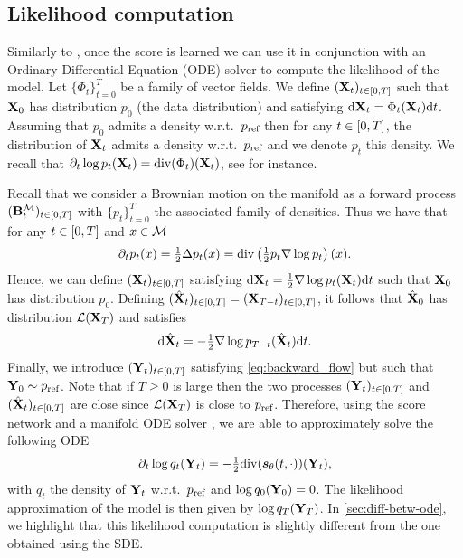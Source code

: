 \subsection{Likelihood computation}
\label{sec:likel-comp}

Similarly to \cite{song2020score}, once the score is learned we can use it
in conjunction with an Ordinary Differential Equation (ODE) solver to compute
the likelihood of the model. Let $\{\Phi_t\}_{t=0}^T$ be a family of vector
fields. We define $(\mathbf{X}_t)_{t \in \left[0,T\right]}$ such that $\mathbf{X}_0$ has
distribution $p_0$ (the data distribution) and satisfying
$\mathrm{d} \mathbf{X}_t = \Phi_t(\mathbf{X}_t) \mathrm{d} t$. Assuming that  $p_0$ admits a density
w.r.t.\ $p_{\textup{ref}}$ then for any $t \in \left[0,T\right]$, the distribution of $\mathbf{X}_t$
admits a density w.r.t.\ $p_{\textup{ref}}$ and we denote $p_t$ this density.  We recall that
$\partial_t \log p_t(\mathbf{X}_t) = \mathrm{div}(\Phi_t)(\mathbf{X}_t)$, see \citet[Proposition 
2]{mathieu2020riemannian} for instance.

Recall that we consider a Brownian motion on the manifold as a forward process
$(\mathbf{B}_t^\mathcal M)_{t \in \left[0,T\right]}$ with $\{p_t\}_{t=0}^T$ the associated family
of densities. Thus we have that for any $t \in \left[0,T\right]$ and $x \in \mathcal M$
\begin{equation}
  \partial_t p_t(x) = \tfrac{1}{2} \Delta p_t(x) = \mathrm{div}\left(\tfrac{1}{2} p_t \nabla \log p_t \right)(x)  . 
\end{equation}
Hence, we can define $(\mathbf{X}_t)_{t \in \left[0,T\right]}$ satisfying
$\mathrm{d} \mathbf{X}_t = \tfrac{1}{2} \nabla \log p_t(\mathbf{X}_t) \mathrm{d} t$ such that $\mathbf{X}_0$ has
distribution $p_0$.
Defining
$(\hat{\mathbf{X}}_t)_{t \in \left[0,T\right]} = (\mathbf{X}_{T-t})_{t \in \left[0,T\right]}$, it follows
that $\hat{\mathbf{X}}_0$ has distribution $\mathcal{L}(\mathbf{X}_T)$ and satisfies
\begin{equation}
  \label{eq:backward_flow}
 \mathrm{d} \hat{\mathbf{X}}_t =-\tfrac{1}{2} \nabla \log p_{T-t}(\hat{\mathbf{X}}_t) \mathrm{d} t  . 
\end{equation}
Finally, we introduce $(\mathbf{Y}_t)_{t \in \left[0,T\right]}$ satisfying
\eqref{eq:backward_flow} but such that $\mathbf{Y}_0 \sim p_{\textup{ref}}$.  Note
that if $T \geq 0$ is large then the two processes
$(\mathbf{Y}_t)_{t \in \left[0,T\right]}$ and $(\hat{\mathbf{X}}_t)_{t \in \left[0,T\right]}$ are close
since $\mathcal{L}(\mathbf{X}_T)$ is close to $p_{\textup{ref}}$.  Therefore, using the score
network and a manifold ODE solver \citep[as in][]{mathieu2020riemannian}, we
are able to approximately solve the following ODE
\begin{equation}
  \partial_t \log q_t(\mathbf{Y}_t) = -\tfrac{1}{2}\mathrm{div}(\bm{s}_\theta(t,\cdot))(\mathbf{Y}_t)  ,
\end{equation}
with $q_t$ the density of $\mathbf{Y}_t$ w.r.t.\ $p_{\textup{ref}}$ and $\log q_0(\mathbf{Y}_0) =
0$. The likelihood approximation of the model is then given by $\log q_T(\mathbf{Y}_T)$. In
\cref{sec:diff-betw-ode}, we highlight that this likelihood computation is
slightly different from the one obtained using the SDE.


